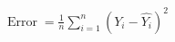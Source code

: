 \documentclass[preview]{standalone}
\begin{document}
\begin{center}
$\displaystyle \operatorname {Error} ={\frac {1}{n}}\sum _{i=1}^{n}\left(Y_{i}-{\hat {Y_{i}}}\right)^{2}$
\end{center}
\end{document}
